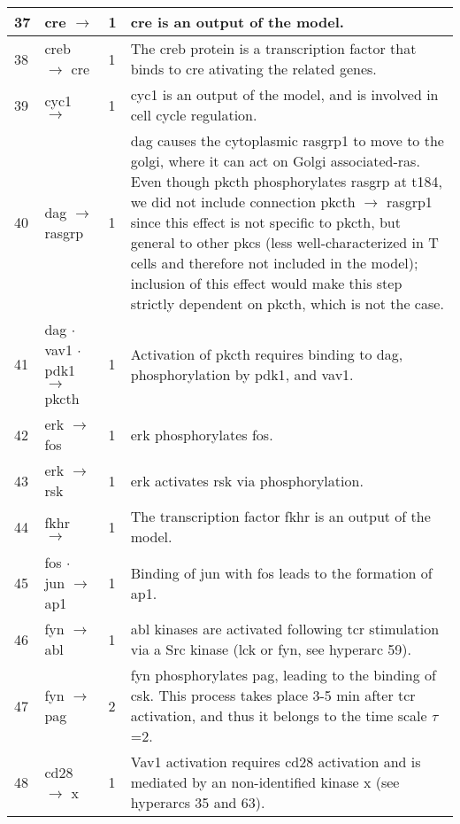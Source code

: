 \documentclass[a4paper, 12pt,epsfig, onecolumn]{article}
\newcommand{\mydot}{\hspace{-0mm} $\cdot$  \hspace{-0mm}}
\begin{document}
{\begin{center}
\begin{longtable}{|p{}|p{}|p{}|p{}|}
37& cre $\rightarrow$                            &1& cre is an output of the model. \\ \hline
38& creb $\rightarrow$ cre                         &1& The creb protein is a transcription factor that binds to cre ativating the related genes\cite{Krauss}. \\ \hline
39& cyc1 $\rightarrow$                               &1& cyc1 is an output of the model, and is involved in  cell cycle regulation\cite{Krauss}. \\ \hline
40& dag $\rightarrow$ rasgrp  &1& dag causes the cytoplasmic rasgrp1 to move to the golgi, where it can act on Golgi associated-ras\cite{DiFiore_Nature_03,BivonaTG_Nature_03}. Even though pkcth phosphorylates rasgrp at t184,\cite{RooseJP_MCB_05} we did not include  connection pkcth  $\rightarrow$  rasgrp1 since this effect is not specific to pkcth, but general to other pkcs (less well-characterized in T cells and therefore not included in the model); inclusion of this effect would make this step strictly dependent on pkcth, which is not the case. \\ \hline
41& dag\mydot vav1\mydot pdk1 $\rightarrow$ pkcth                 &1& Activation of pkcth requires binding to dag, phosphorylation by pdk1\cite{LeeKY_Science_05}, and vav1\cite{VillalbaM_JCB_02}. \\ \hline
42& erk $\rightarrow$ fos                                 &1& erk phosphorylates fos\cite{Huang_JBC_04}. \\ \hline
43& erk $\rightarrow$ rsk                         &1& erk activates rsk via phosphorylation\cite{FrodinM_MCE_99}. \\ \hline
44& fkhr $\rightarrow$                            &1& The transcription factor fkhr is an output of the model. \\ \hline
45& fos\mydot jun $\rightarrow$ ap1                       &1& Binding of jun with fos leads to the formation of ap1\cite{Huang_JBC_04,Krauss}. \\ \hline
46& fyn $\rightarrow$ abl     &1& abl kinases are activated following tcr stimulation via a Src kinase (lck or fyn, see hyperarc 59)\cite{ZipfelPA_CurrBiol_04}. \\ \hline
47& fyn $\rightarrow$ pag                               &2& fyn phosphorylates pag\cite{DavidsonD_MCB_03}, leading to the binding of csk. This process takes place 3-5 min after tcr activation, and thus it belongs to the time scale $\tau$=2\cite{TorgersenKM_JBC_01}. \\ \hline 
48& cd28 $\rightarrow$ x                                &1& Vav1 activation requires cd28 activation\cite{MichelF_Jimmunol_00,Raab2001,Kovacs2005} and is mediated by an non-identified kinase x (see hyperarcs 35 and 63). \\ \hline

\end{longtable}
\end{center}}
\end{document}
